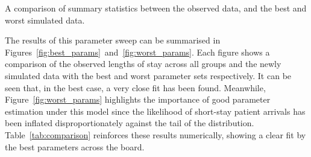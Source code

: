 \begin{table}
    \centering
    \resizebox{\imgwidth}{!}{}
    \caption{A comparison of summary statistics between the observed data, and
        the best and worst simulated data.}\label{tab:comparison}
\end{table}

The results of this parameter sweep can be summarised in
Figures~\ref{fig:best_params}~and~\ref{fig:worst_params}. Each figure shows a
comparison of the observed lengths of stay across all groups and the newly
simulated data with the best and worst parameter sets respectively. It can be
seen that, in the best case, a very close fit has been found. Meanwhile,
Figure~\ref{fig:worst_params} highlights the importance of good parameter
estimation under this model since the likelihood of short-stay patient arrivals
has been inflated disproportionately against the tail of the distribution.
Table~\ref{tab:comparison} reinforces these results numerically, showing a
clear fit by the best parameters across the board.
